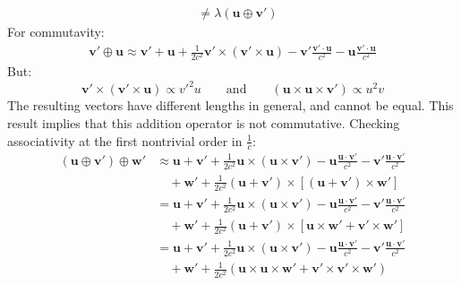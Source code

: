 \documentclass[12pt,a4]{article}
\begin{document}
\begin{enumerate}
\begin{enumerate}
\begin{align*}
                                                           &\neq \lambda(\mathbf{u}\oplus \mathbf{v'})
        \end{align*}
        For commutavity:
      \begin{align*}
          \mathbf{v'}\oplus \mathbf{u} \approx \mathbf{v}' + \mathbf{u} + \frac{1}{2c^2}\mathbf{v'}\times(\mathbf{v'} \times \mathbf{u}) - \mathbf{v}'\frac{\mathbf{v'}\cdot\mathbf{u}}{c^2} - \mathbf{u}\frac{\mathbf{v'}\cdot\mathbf{u}}{c^2}
      \end{align*}
      But:
      \begin{equation*}
        \mathbf{v'}\times(\mathbf{v'} \times \mathbf{u}) \propto  v'^2 u \qquad \text{and} \qquad (\mathbf{u}\times \mathbf{u} \times \mathbf{v'}) \propto u^2 v
      \end{equation*}
      The resulting vectors have different lengths in general, and cannot be equal.
      This result implies that this addition operator is not commutative.
      Checking associativity at the first nontrivial order in $\frac{1}{c}$:
        \begin{align*}
          (\mathbf{u}\oplus \mathbf{v'})\oplus \mathbf{w'} &\approx \mathbf{u} + \mathbf{v}' + \frac{1}{2c^2}\mathbf{u}\times(\mathbf{u} \times \mathbf{v}') - \mathbf{u}\frac{\mathbf{u}\cdot\mathbf{v}'}{c^2} - \mathbf{v}'\frac{\mathbf{u}\cdot\mathbf{v}'}{c^2}\\
                                                           & \quad + \mathbf{w'} +\frac{1}{2c^2} (\mathbf{u} + \mathbf{v}') \times \left[(\mathbf{u} + \mathbf{v}') \times \mathbf{w'}\right]\\
                                                           &= \mathbf{u} + \mathbf{v}' + \frac{1}{2c^2}\mathbf{u}\times(\mathbf{u} \times \mathbf{v}') - \mathbf{u}\frac{\mathbf{u}\cdot\mathbf{v}'}{c^2} - \mathbf{v}'\frac{\mathbf{u}\cdot\mathbf{v}'}{c^2}\\
                                                           & \quad + \mathbf{w'} +\frac{1}{2c^2} (\mathbf{u} + \mathbf{v}') \times \left[\mathbf{u} \times \mathbf{w'} + \mathbf{v}'\times \mathbf{w'} \right]\\
                                                           &= \mathbf{u} + \mathbf{v}' + \frac{1}{2c^2}\mathbf{u}\times(\mathbf{u} \times \mathbf{v}') - \mathbf{u}\frac{\mathbf{u}\cdot\mathbf{v}'}{c^2} - \mathbf{v}'\frac{\mathbf{u}\cdot\mathbf{v}'}{c^2}\\
                                                           & \quad + \mathbf{w'} +\frac{1}{2c^2} (\mathbf{u} \times \mathbf{u} \times \mathbf{w'} + \mathbf{v}'\times \mathbf{v}'\times \mathbf{w'}) 

\end{align*}
\end{enumerate}
\end{enumerate}
\end{document}
